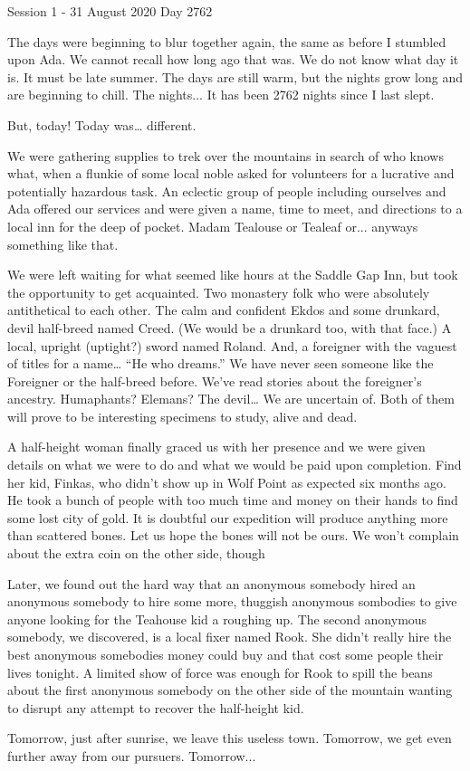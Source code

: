 Session 1 - 31 August 2020
Day 2762

The days were beginning to blur together again, the same as before I stumbled upon Ada.  We cannot recall how long ago that was.  We do not know what day it is.  It must be late summer.  The days are still warm, but the nights grow long and are beginning to chill.  The nights... It has been 2762 nights since I last slept.

But, today!  Today was… different.

We were gathering supplies to trek over the mountains in search of who knows what, when a flunkie of some local noble asked for volunteers for a lucrative and potentially hazardous task.  An eclectic group of people including ourselves and Ada offered our services and were given a name, time to meet, and directions to a local inn for the deep of pocket.  Madam Tealouse or Tealeaf or...  anyways something like that.

We were left waiting for what seemed like hours at the Saddle Gap Inn, but took the opportunity to get acquainted.  Two monastery folk who were absolutely antithetical to each other. The calm and confident Ekdos and some drunkard, devil half-breed named Creed. (We would be a drunkard too, with that face.) A local, upright (uptight?) sword named Roland. And, a foreigner with the vaguest of titles for a name… “He who dreams.”  We have never seen someone like the Foreigner or the half-breed before.  We’ve read stories about the foreigner’s ancestry. Humaphants? Elemans?  The devil… We are uncertain of.  Both of them will prove to be interesting specimens to study, alive and dead.

A half-height woman finally graced us with her presence and we were given details on what we were to do and what we would be paid upon completion.  Find her kid, Finkas, who didn’t show up in Wolf Point as expected six months ago.  He took a bunch of people with too much time and money on their hands to find some lost city of gold.  It is doubtful our expedition will produce anything more than scattered bones.  Let us hope the bones will not be ours.  We won’t complain about the extra coin on the other side, though

Later, we found out the hard way that an anonymous somebody hired an anonymous somebody to hire some more, thuggish anonymous sombodies to give anyone looking for the Teahouse kid a roughing up.  The second anonymous somebody, we discovered, is a local fixer named Rook.  She didn’t really hire the best anonymous somebodies money could buy and that cost some people their lives tonight.  A limited show of force was enough for Rook to spill the beans about the first anonymous somebody on the other side of the mountain wanting to disrupt any attempt to recover the half-height kid.

Tomorrow, just after sunrise, we leave this useless town.  Tomorrow, we get even further away from our pursuers.  Tomorrow... 
